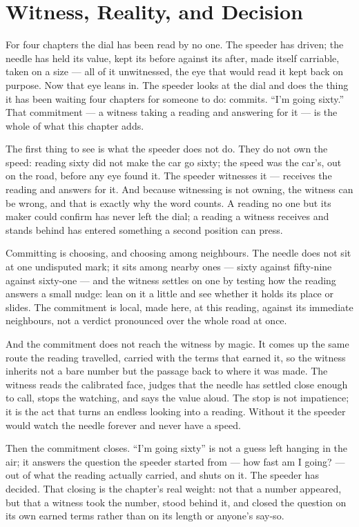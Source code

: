 \chapter{Witness, Reality, and Decision}

For four chapters the dial has been read by no one. The speeder has driven; the needle has held its value, kept its before against its after, made itself carriable, taken on a size --- all of it unwitnessed, the eye that would read it kept back on purpose. Now that eye leans in. The speeder looks at the dial and does the thing it has been waiting four chapters for someone to do: commits. ``I'm going sixty.'' That commitment --- a witness taking a reading and answering for it --- is the whole of what this chapter adds.

The first thing to see is what the speeder does not do. They do not own the speed: reading sixty did not make the car go sixty; the speed was the car's, out on the road, before any eye found it. The speeder witnesses it --- receives the reading and answers for it. And because witnessing is not owning, the witness can be wrong, and that is exactly why the word counts. A reading no one but its maker could confirm has never left the dial; a reading a witness receives and stands behind has entered something a second position can press.

Committing is choosing, and choosing among neighbours. The needle does not sit at one undisputed mark; it sits among nearby ones --- sixty against fifty-nine against sixty-one --- and the witness settles on one by testing how the reading answers a small nudge: lean on it a little and see whether it holds its place or slides. The commitment is local, made here, at this reading, against its immediate neighbours, not a verdict pronounced over the whole road at once.

And the commitment does not reach the witness by magic. It comes up the same route the reading travelled, carried with the terms that earned it, so the witness inherits not a bare number but the passage back to where it was made. The witness reads the calibrated face, judges that the needle has settled close enough to call, stops the watching, and says the value aloud. The stop is not impatience; it is the act that turns an endless looking into a reading. Without it the speeder would watch the needle forever and never have a speed.

Then the commitment closes. ``I'm going sixty'' is not a guess left hanging in the air; it answers the question the speeder started from --- how fast am I going? --- out of what the reading actually carried, and shuts on it. The speeder has decided. That closing is the chapter's real weight: not that a number appeared, but that a witness took the number, stood behind it, and closed the question on its own earned terms rather than on its length or anyone's say-so.

